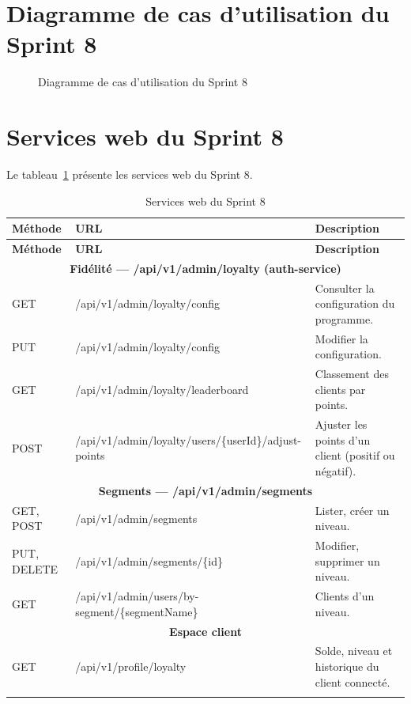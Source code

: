 \section{Diagramme de cas d'utilisation du Sprint 8}
\begin{figure}[H]
    \centering
    \caption{Diagramme de cas d'utilisation du Sprint 8}
    \label{fig:cu-sprint8}
\end{figure}

\section{Services web du Sprint 8}
Le tableau~\ref{tab:ws-sprint8} présente les services web du Sprint 8.
\renewcommand{\arraystretch}{1.15}
\setlength{\tabcolsep}{4pt}
\begin{longtable}{|p{2cm}|p{9.3cm}|p{3.2cm}|}
\hline
\textbf{Méthode} & \textbf{URL} & \textbf{Description} \\
\hline
\endfirsthead
\hline
\textbf{Méthode} & \textbf{URL} & \textbf{Description} \\
\hline
\endhead
\multicolumn{3}{|c|}{\textbf{Fidélité --- /api/v1/admin/loyalty (auth-service)}} \\
\hline
GET & /api/v1/admin/loyalty/config & Consulter la configuration du programme. \\
\hline
PUT & /api/v1/admin/loyalty/config & Modifier la configuration. \\
\hline
GET & /api/v1/admin/loyalty/leaderboard & Classement des clients par points. \\
\hline
POST & /api/v1/admin/loyalty/users/\{userId\}/adjust-points & Ajuster les points d'un client (positif ou négatif). \\
\hline
\multicolumn{3}{|c|}{\textbf{Segments --- /api/v1/admin/segments}} \\
\hline
GET, POST & /api/v1/admin/segments & Lister, créer un niveau. \\
\hline
PUT, DELETE & /api/v1/admin/segments/\{id\} & Modifier, supprimer un niveau. \\
\hline
GET & /api/v1/admin/users/by-segment/\{segmentName\} & Clients d'un niveau. \\
\hline
\multicolumn{3}{|c|}{\textbf{Espace client}} \\
\hline
GET & /api/v1/profile/loyalty & Solde, niveau et historique du client connecté. \\
\hline
\caption{Services web du Sprint 8}
\label{tab:ws-sprint8}
\end{longtable}

